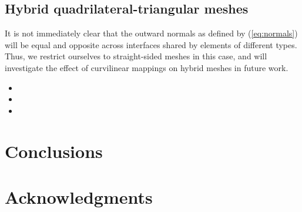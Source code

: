 \documentclass{svjour3}                     %
\renewcommand{\note}[1]{{\color{blue}{#1}}}
\begin{document}
\subsection{Hybrid quadrilateral-triangular meshes}

It is not immediately clear that the outward normals as defined by (\ref{eq:normals}) will be equal and opposite across interfaces shared by elements of different types.  Thus, we restrict ourselves to straight-sided meshes in this case, and will investigate the effect of curvilinear mappings on hybrid meshes in future work.  

\begin{itemize}
\item \note{GQ-GQ hexes, tris}
\item \note{GLL-GQ hexes, tris}
\item \note{GQ-GLL hexes, GLL tris}
\end{itemize}

\section{Conclusions}

\note{GLL quadrature really is super convenient.}

\note{Need mortar to .}


\section{Acknowledgments}

%




\end{document}
